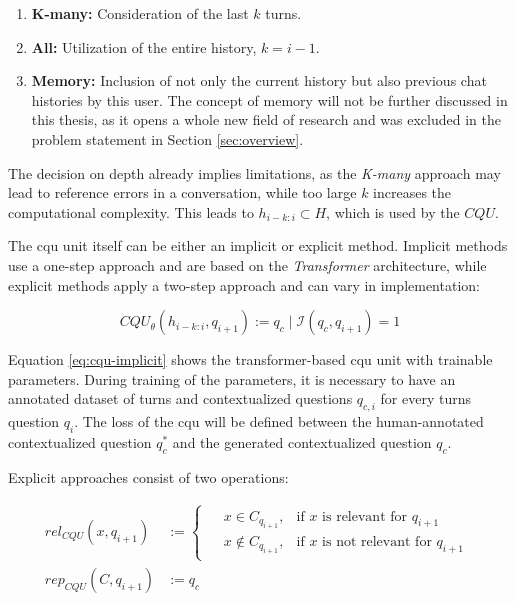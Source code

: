 \begin{enumerate}
    \item \textbf{K-many:} Consideration of the last $k$ turns.
    \item \textbf{All:} Utilization of the entire history, $k = i - 1$.
    \item \textbf{Memory:} Inclusion of not only the current history but also previous chat histories by this user. The concept of memory will not be further discussed in this thesis, as it opens a whole new field of research and was excluded in the problem statement in Section \ref{sec:overview}.
\end{enumerate}

The decision on depth already implies limitations, as the \textit{K-many} approach may lead to reference errors in a conversation, while too large $k$ increases the computational complexity. This leads to $h_{i-k:i} \subset H$, which is used by the $CQU$.

The \gls{cqu} unit itself can be either an implicit or explicit method. Implicit methods use a one-step approach and are based on the \textit{Transformer} architecture, while explicit methods apply a two-step approach and can vary in implementation:

\begin{equation}
    CQU_{\theta}(h_{i-k:i}, q_{i+1}) := q_c \mid \mathcal{I}(q_c, q_{i+1}) = 1 
    \label{eq:cqu-implicit} 
\end{equation}

Equation \ref{eq:cqu-implicit} shows the transformer-based \gls{cqu} unit with trainable parameters. During training of the parameters, it is necessary to have an annotated dataset of turns and contextualized questions $q_{c,i}$ for every turns question $q_i$. The loss of the \gls{cqu} will be defined between the human-annotated contextualized question $q_c^*$ and the generated contextualized question $q_c$.

Explicit approaches consist of two operations:

\begin{align}
    rel_{CQU}(x, q_{i+1}) &:= 
    \begin{cases}
        \begin{aligned}
            & x \in C_{q_{i+1}}, & \text{if } x \text{ is relevant for } q_{i+1}\\
            & x \not\in C_{q_{i+1}}, & \text{if }  x \text{ is not relevant for } q_{i+1}
        \end{aligned}
    \end{cases} \\
    rep_{CQU}(C, q_{i+1}) &:= q_c
\end{align}

